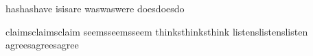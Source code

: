 \pronoun{\have}    {has}{has}{have}
\pronoun{\are}    {is}{is}{are}
\pronoun{\were}   {was}{was}{were}
\pronoun{\does}   {does}{does}{do}

\newcommand{\simpleverb}[1]{\mfn{{#1}s}{{#1}s}{#1}}

\pronoun{\claim}  {claims}{claims}{claim}
\pronoun{\seem}   {seems}{seems}{seem}
\pronoun{\think}  {thinks}{thinks}{think}
\pronoun{\listen}  {listens}{listens}{listen}
\pronoun{\agree} {agrees}{agrees}{agree}












  

